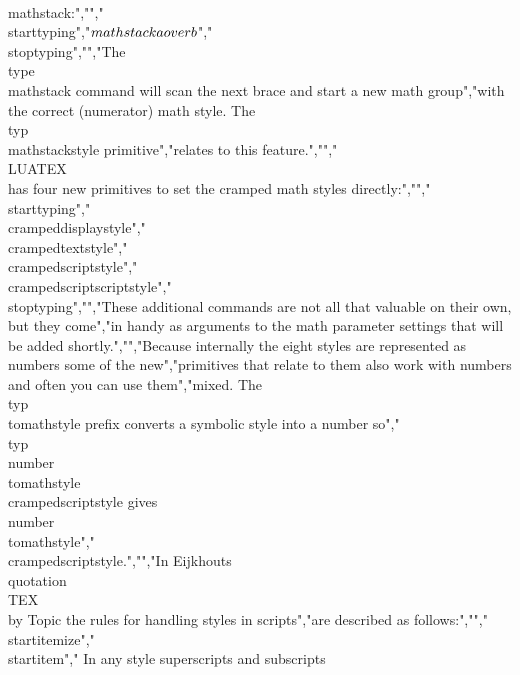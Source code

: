 {\\mathstack}:","","\\starttyping","$\\mathstack {a \\over b}$","\\stoptyping","","The \\type {\\mathstack} command will scan the next brace and start a new math group","with the correct (numerator) math style. The \\typ {\\mathstackstyle} primitive","relates to this feature.","","\\LUATEX\\ has four new primitives to set the cramped math styles directly:","","\\starttyping","\\crampeddisplaystyle","\\crampedtextstyle","\\crampedscriptstyle","\\crampedscriptscriptstyle","\\stoptyping","","These additional commands are not all that valuable on their own, but they come","in handy as arguments to the math parameter settings that will be added shortly.","","Because internally the eight styles are represented as numbers some of the new","primitives that relate to them also work with numbers and often you can use them","mixed. The \\typ {\\tomathstyle} prefix converts a symbolic style into a number so","\\typ {\\number \\tomathstyle \\crampedscriptstyle} gives~\\number \\tomathstyle","\\crampedscriptstyle.","","In Eijkhouts \\quotation {\\TEX\\ by Topic} the rules for handling styles in scripts","are described as follows:","","\\startitemize","\\startitem","    In any style superscripts and subscripts 